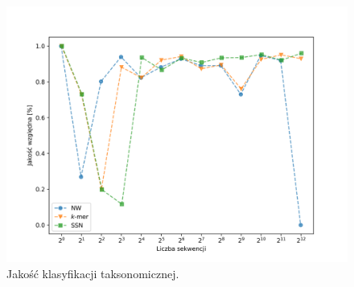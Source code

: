                 \begin{figure}[!htb]
                    \begin{center}
                        \includegraphics[width=\textwidth]{tex/pictures/exp/experiment_quality.png}
                    \end{center}
                    \caption{
                        Jakość klasyfikacji taksonomicznej.
                    }\label{Picture:Experiment:Quality}
                \end{figure}

